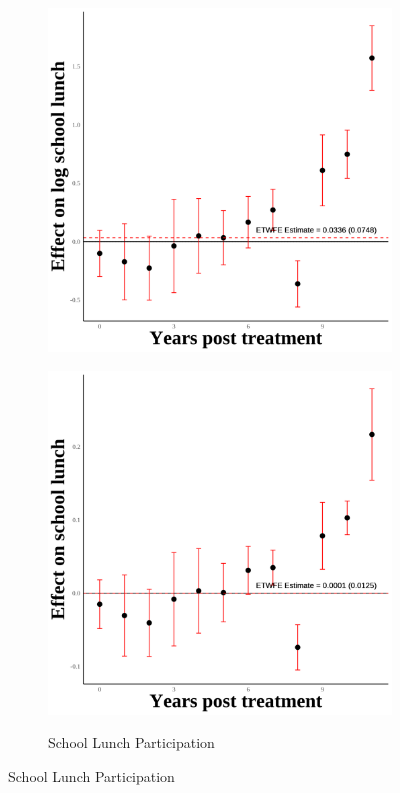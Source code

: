 \documentclass[12pt,english]{article}
\begin{document}
\begin{figure}[H]
\begin{subfigure}[b]{0.3\textwidth}
    \includegraphics[width=\linewidth]{figures/plot74-ln_schl_lunch_event_study-third-three.png}
    \label{fig:ln-schl-lunch-third-three}
  \end{subfigure}
  \hfill
  \begin{subfigure}[b]{0.3\textwidth}
    \centering
    \caption{School Lunch Participation}
    \includegraphics[width=\linewidth]{figures/plot75-schl_lunch_event_study-third-three.png}
    \label{fig:schl-lunch-third-three}
  \end{subfigure}


\end{figure}
\end{document}
